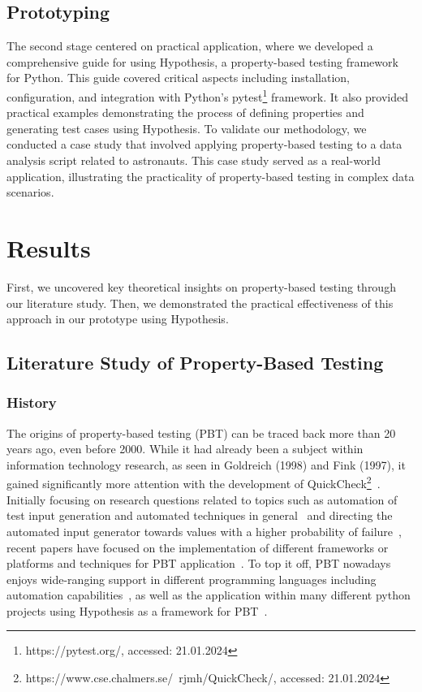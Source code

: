 \documentclass[runningheads]{llncs}
\begin{document}
\subsection{Prototyping}
The second stage centered on practical application, where we developed a comprehensive guide for using Hypothesis, a property-based testing framework for Python. This guide covered critical aspects including installation, configuration, and integration with Python's pytest\footnote{https://pytest.org/, accessed: 21.01.2024} framework. It also provided practical examples demonstrating the process of defining properties and generating test cases using Hypothesis. To validate our methodology, we conducted a case study that involved applying property-based testing to a data analysis script related to astronauts. This case study served as a real-world application, illustrating the practicality of property-based testing in complex data scenarios.

\section{Results}
First, we uncovered key theoretical insights on property-based testing through our literature study. Then, we demonstrated the practical effectiveness of this approach in our prototype using Hypothesis.

\subsection{Literature Study of Property-Based Testing}
\subsubsection{History}
The origins of property-based testing (PBT) can be traced back more than 20 years ago, even before 2000. While it had already been a subject within information technology research, as seen in Goldreich (1998) and Fink (1997), it gained significantly more attention with the development of QuickCheck\footnote{https://www.cse.chalmers.se/~rjmh/QuickCheck/, accessed: 21.01.2024}~\cite{Shi2023,Fink1997,MacIver2019,Honarvar2020}. Initially focusing on research questions related to topics such as automation of test input generation and automated techniques in general~\cite{Fink1997} and directing the automated input generator towards values with a higher probability of failure~\cite{Loescher2017}, recent papers have focused on the implementation of different frameworks or platforms and techniques for PBT application~\cite{Padhye2019,Honarvar2020,Shi2023,Corgozinho2023}. To top it off, PBT nowadays enjoys wide-ranging support in different programming languages including automation capabilities~\cite{Chen2022,Padhye2019,Honarvar2020,ElazarMittelman2023,Shi2023}, as well as the application within many different python projects using Hypothesis as a framework for PBT~\cite{Corgozinho2023}.
\end{document}
